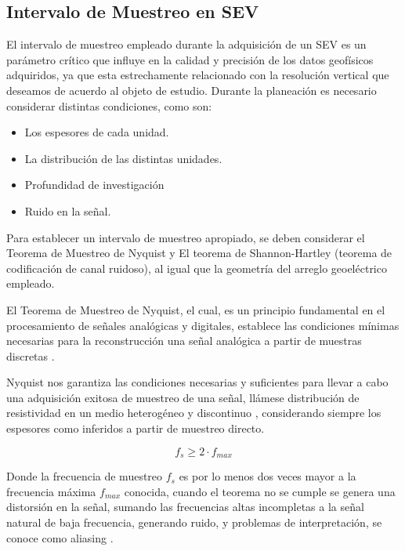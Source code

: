 		\subsection{Intervalo de Muestreo en SEV}
			
			El intervalo de muestreo empleado durante la adquisición de un SEV es un parámetro crítico que influye en la calidad y precisión de los datos geofísicos adquiridos, ya que esta estrechamente relacionado con la resolución vertical que deseamos de acuerdo al objeto de estudio. Durante la planeación es necesario considerar distintas condiciones, como son:
			
			\begin{itemize}
				\item Los espesores de cada unidad.
				\item La distribución de las distintas unidades.
				\item Profundidad de investigación
				\item Ruido en la señal.
			\end{itemize}
			
			Para establecer un intervalo de muestreo apropiado, se deben considerar el Teorema de Muestreo de Nyquist y El teorema de Shannon-Hartley (teorema de codificación de canal ruidoso), al igual que la geometría del arreglo geoeléctrico empleado.
			
			El Teorema de Muestreo de Nyquist, el cual, es un principio fundamental en el procesamiento de señales analógicas y digitales, establece las condiciones mínimas necesarias para la reconstrucción una señal analógica a partir de muestras discretas \citep{alvarado2010}.
			
			Nyquist nos garantiza las condiciones necesarias y suficientes para llevar a cabo una adquisición exitosa de muestreo de una señal, llámese distribución de resistividad en un medio heterogéneo y discontinuo \citep{alvarado2010}, considerando siempre los espesores como inferidos a partir de muestreo directo.
			
			\begin{equation}
				f_{s} \geq 2 \cdot f_{max}
			\end{equation}
			
			Donde la frecuencia de muestreo $f_{s}$ es por lo menos dos veces mayor a la frecuencia máxima $f_{max}$ conocida, cuando el teorema no se cumple se genera una distorsión en la señal, sumando las frecuencias altas incompletas a la señal natural de baja frecuencia, generando ruido, y problemas de interpretación, se conoce como aliasing \citep{alvarado2010}. 
			
